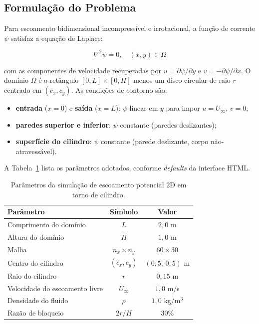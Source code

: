 \subsection{Formulação do Problema}

Para escoamento bidimensional incompressível e irrotacional, a função de corrente $\psi$ satisfaz a equação de Laplace:

\begin{equation}
    \nabla^2 \psi = 0, \quad (x, y) \in \Omega
    \label{eq:val_potencial_edp}
\end{equation}

\noindent com as componentes de velocidade recuperadas por $u = \partial \psi / \partial y$ e $v = -\partial \psi / \partial x$. O domínio $\Omega$ é o retângulo $[0, L] \times [0, H]$ menos um disco circular de raio $r$ centrado em $(c_x, c_y)$. As condições de contorno são:
\begin{itemize}
    \item \textbf{entrada} ($x = 0$) e \textbf{saída} ($x = L$): $\psi$ linear em $y$ para impor $u = U_{\infty}$, $v = 0$;
    \item \textbf{paredes superior e inferior}: $\psi$ constante (paredes deslizantes);
    \item \textbf{superfície do cilindro}: $\psi$ constante (parede deslizante, corpo não-atravessável).
\end{itemize}

A Tabela~\ref{tab:val_potencial_params} lista os parâmetros adotados, conforme \emph{defaults} da interface HTML.

\begin{table}[htbp]
    \centering
    \caption{Parâmetros da simulação de escoamento potencial 2D em torno de cilindro.}
    \label{tab:val_potencial_params}
    \begin{tabular}{lcc}
        \hline
        \textbf{Parâmetro} & \textbf{Símbolo} & \textbf{Valor} \\
        \hline
        Comprimento do domínio       & $L$         & $2{,}0$ m      \\
        Altura do domínio            & $H$         & $1{,}0$ m      \\
        Malha                        & $n_x \times n_y$ & $60 \times 30$ \\
        Centro do cilindro           & $(c_x, c_y)$ & $(0{,}5;\, 0{,}5)$ m \\
        Raio do cilindro             & $r$         & $0{,}15$ m     \\
        Velocidade do escoamento livre & $U_{\infty}$ & $1{,}0$ m/s \\
        Densidade do fluido          & $\rho$      & $1{,}0$ kg/m$^3$ \\
        Razão de bloqueio            & $2r / H$    & $30\%$         \\
        \hline
    \end{tabular}
\end{table}

